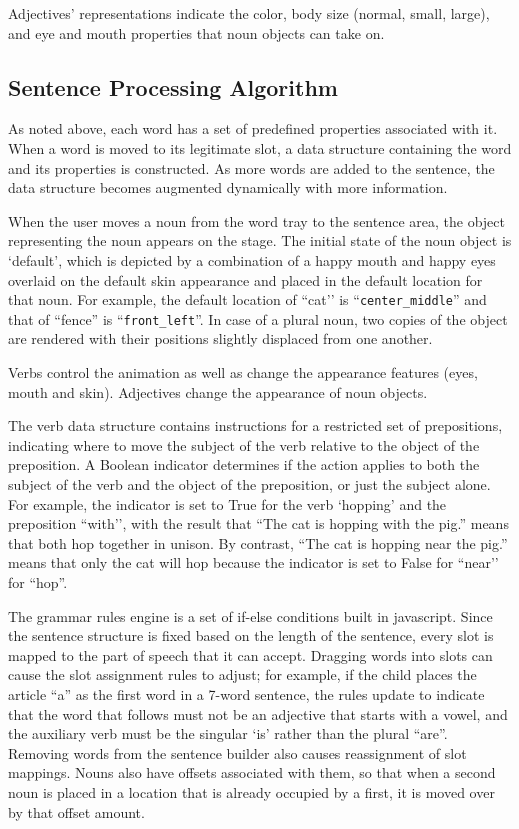 \documentclass{sigchi-ext}
\begin{document}
Adjectives’ representations indicate the color, body size (normal, small, large), and eye and mouth properties that noun objects can take on.




\subsection{Sentence Processing Algorithm}
As noted above, each word has a set of predefined properties associated with it. When a word is moved to its legitimate slot, a data structure containing the word and its properties is constructed.  As more words are added to the sentence, the data structure becomes augmented dynamically with more information.


When the user moves a noun from the word tray to the sentence area, the object representing the noun appears on the stage. The initial state of the noun object is ‘default’, which is depicted by a combination of a happy mouth and happy eyes overlaid on the default skin appearance and placed in the default location for that noun.  For example, the default location of ``cat’' is ``\texttt {center\_middle}'' and that of ``fence'' is ``\texttt {front\_left}''. In case of a plural noun, two copies of the object are rendered with their positions slightly displaced from one another.

Verbs control the animation as well as change the appearance features (eyes, mouth and skin). Adjectives change the appearance of noun objects.

The verb data structure contains instructions for a restricted set of prepositions, indicating where to move the subject of the verb relative to the object of the preposition.  A Boolean indicator determines if the action applies to both the subject of the verb and the object of the preposition, or just the subject alone.  For example, the indicator is set to True for the verb ‘hopping’ and the preposition ``with’', with the result that ``The cat is hopping with the pig.'' means that both hop together in unison.  By contrast, ``The cat is hopping near the pig.'' means that only the cat will hop because the indicator is set to False for ``near’' for ``hop''.

The grammar rules engine is a set of if-else conditions built in javascript.  Since the sentence structure is fixed based on the length of the sentence, every slot is mapped to the part of speech that it can accept.  Dragging words into slots can cause the slot assignment rules to adjust; for example, if the child places the article ``a'' as the first word in a 7-word sentence, the rules update to indicate that the word that follows must not be an adjective that starts with a vowel, and the auxiliary verb must be the singular ‘is’ rather than the plural ``are''.   Removing words from the sentence builder also causes reassignment of slot mappings.  Nouns also have offsets associated with them, so that when a second noun is placed in a location that is already occupied by a first, it is moved over by that offset amount.
\end{document}
